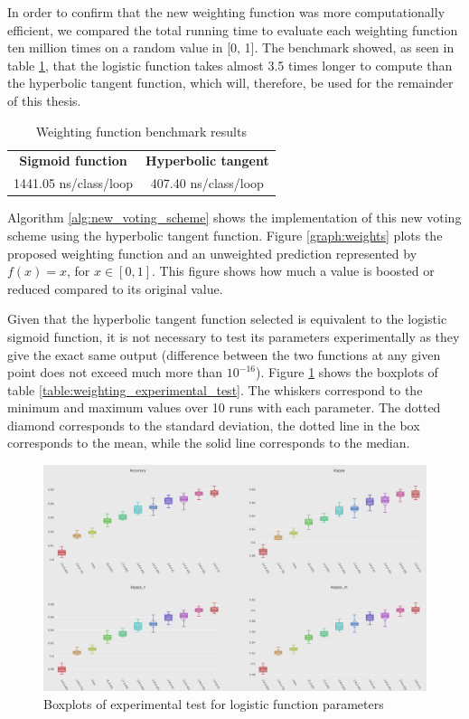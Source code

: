 In order to confirm that the new weighting function was more computationally efficient, we compared the total running time to evaluate each weighting function ten million times on a random value in [0, 1]. The benchmark showed, as seen in table \ref{table:weight_benchmark}, that the logistic function takes almost 3.5 times longer to compute than the hyperbolic tangent function, which will, therefore, be used for the remainder of this thesis.

\begin{table}[]
\centering
\caption{\label{table:weight_benchmark}Weighting function benchmark results}
\begin{tabular}{|c|c|}
\hline
\textbf{Sigmoid function} & \textbf{Hyperbolic tangent} \\ \hhline{==}
1441.05 ns/class/loop & 407.40 ns/class/loop \\ \hline
\end{tabular}
\end{table}

Algorithm \ref{alg:new_voting_scheme} shows the implementation of this new voting scheme using the hyperbolic tangent function. Figure \ref{graph:weights} plots the proposed weighting function and an unweighted prediction represented by $f(x) =x$, for  $x \in [0,1]$. This figure shows how much a value is boosted or reduced compared to its original value.

Given that the hyperbolic tangent function selected is equivalent to the logistic sigmoid function, it is not necessary to test its parameters experimentally as they give the exact same output (difference between the two functions at any given point does not exceed much more than $10^{-16}$). Figure \ref{fig:boxplots_params} shows the boxplots of table \ref{table:weighting_experimental_test}. The whiskers correspond to the minimum and maximum values over 10 runs with each parameter. The dotted diamond corresponds to the standard deviation, the dotted line in the box corresponds to the mean, while the solid line corresponds to the median.

\begin{figure}
  \includegraphics[width=\linewidth]{./images/chapter3/boxplots_params}
\caption{\label{fig:boxplots_params}Boxplots of experimental test for logistic function parameters}
\end{figure}


